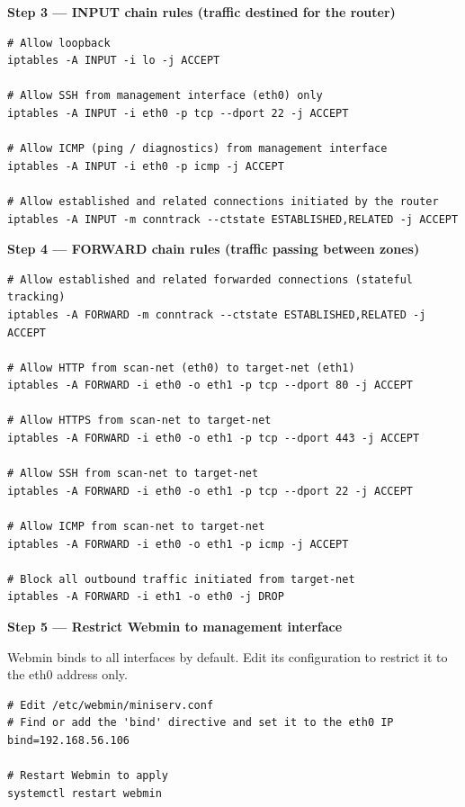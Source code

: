 \documentclass[12pt]{article}
\begin{document}
\bigskip
\noindent\textbf{Step 3 --- INPUT chain rules (traffic destined for the router)}
 
\begin{lstlisting}[style=terminal]
# Allow loopback
iptables -A INPUT -i lo -j ACCEPT
 
# Allow SSH from management interface (eth0) only
iptables -A INPUT -i eth0 -p tcp --dport 22 -j ACCEPT
 
# Allow ICMP (ping / diagnostics) from management interface
iptables -A INPUT -i eth0 -p icmp -j ACCEPT
 
# Allow established and related connections initiated by the router
iptables -A INPUT -m conntrack --ctstate ESTABLISHED,RELATED -j ACCEPT
\end{lstlisting}
 
\bigskip
\noindent\textbf{Step 4 --- FORWARD chain rules (traffic passing between zones)}
 
\begin{lstlisting}[style=terminal]
# Allow established and related forwarded connections (stateful tracking)
iptables -A FORWARD -m conntrack --ctstate ESTABLISHED,RELATED -j ACCEPT
 
# Allow HTTP from scan-net (eth0) to target-net (eth1)
iptables -A FORWARD -i eth0 -o eth1 -p tcp --dport 80 -j ACCEPT
 
# Allow HTTPS from scan-net to target-net
iptables -A FORWARD -i eth0 -o eth1 -p tcp --dport 443 -j ACCEPT
 
# Allow SSH from scan-net to target-net
iptables -A FORWARD -i eth0 -o eth1 -p tcp --dport 22 -j ACCEPT
 
# Allow ICMP from scan-net to target-net
iptables -A FORWARD -i eth0 -o eth1 -p icmp -j ACCEPT
 
# Block all outbound traffic initiated from target-net
iptables -A FORWARD -i eth1 -o eth0 -j DROP
\end{lstlisting}
 
\bigskip
\noindent\textbf{Step 5 --- Restrict Webmin to management interface}
 
Webmin binds to all interfaces by default. Edit its configuration to restrict
it to the eth0 address only.
 
\begin{lstlisting}[style=terminal]
# Edit /etc/webmin/miniserv.conf
# Find or add the 'bind' directive and set it to the eth0 IP
bind=192.168.56.106
 
# Restart Webmin to apply
systemctl restart webmin
\end{lstlisting}
 
\end{document}
